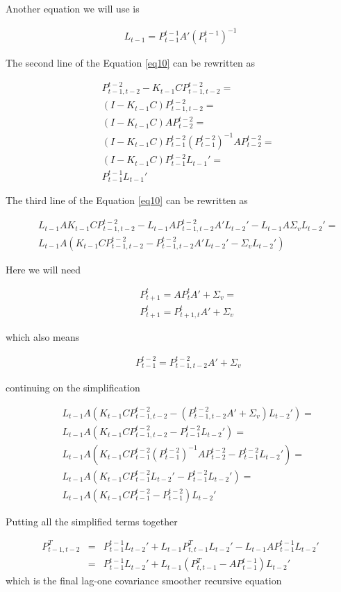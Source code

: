 \documentclass[12pt]{report}
\begin{document}
Another equation we will use is

\begin{eqnarray*}
L_{t-1} = P_{t-1}^{t-1}A'(P_t^{t-1})^{-1}
\end{eqnarray*}

The second line of the Equation \eqref{eq10} can be rewritten as

\begin{eqnarray*}
&& P_{t-1,t-2}^{t-2} - K_{t-1}CP_{t-1,t-2}^{t-2} = \\
&& (I - K_{t-1}C)P_{t-1,t-2}^{t-2} = \\
&& (I - K_{t-1}C) AP_{t-2}^{t-2} = \\
&& (I - K_{t-1}C)P_{t-1}^{t-2}(P_{t-1}^{t-2})^{-1}AP_{t-2}^{t-2} =\\
&& (I - K_{t-1}C)P_{t-1}^{t-2}L_{t-1}' = \\
&& P_{t-1}^{t-1}L_{t-1}'
\end{eqnarray*}

The third line of the Equation \eqref{eq10} can be rewritten as

\begin{eqnarray*}
&& L_{t-1}AK_{t-1}CP_{t-1,t-2}^{t-2} - L_{t-1}AP_{t-1,t-2}^{t-2}A'L_{t-2}' - L_{t-1}A\Sigma_vL_{t-2}'=\\
&& L_{t-1}A(K_{t-1}CP_{t-1,t-2}^{t-2} - P_{t-1,t-2}^{t-2}A'L_{t-2}' - \Sigma_vL_{t-2}')
\end{eqnarray*}

Here we will need 

\begin{eqnarray*}
&& P_{t+1}^t = AP_{t}^tA' + \Sigma_v =\\
&& P_{t+1}^t = P_{t+1,t}^tA' + \Sigma_v
\end{eqnarray*}

which also means

\begin{eqnarray*}
&& P_{t-1}^{t-2} = P_{t-1,t-2}^{t-2}A' + \Sigma_v
\end{eqnarray*}

continuing on the simplification

\begin{eqnarray*}
&& L_{t-1}A(K_{t-1}CP_{t-1,t-2}^{t-2} - (P_{t-1,t-2}^{t-2}A' + \Sigma_v)L_{t-2}')=\\
&& L_{t-1}A(K_{t-1}CP_{t-1,t-2}^{t-2} - P_{t-1}^{t-2}L_{t-2}')=\\
&& L_{t-1}A(K_{t-1}C P_{t-1}^{t-2}(P_{t-1}^{t-2})^{-1} A P_{t-2}^{t-2} - P_{t-1}^{t-2}L_{t-2}')=\\
&& L_{t-1}A(K_{t-1}C P_{t-1}^{t-2}L_{t-2}' - P_{t-1}^{t-2}L_{t-2}')=\\
&& L_{t-1}A(K_{t-1}C P_{t-1}^{t-2} - P_{t-1}^{t-2})L_{t-2}'
\end{eqnarray*}

Putting all the simplified terms together

\begin{eqnarray*}
P_{t-1,t-2}^T &=& P_{t-1}^{t-1}L_{t-2}' + L_{t-1}P_{t,t-1}^TL_{t-2}'
- L_{t-1}AP_{t-1}^{t-1}L_{t-2}'\\
 &=& P_{t-1}^{t-1}L_{t-2}' + L_{t-1}(P_{t,t-1}^T - AP_{t-1}^{t-1})L_{t-2}'
\end{eqnarray*}
which is the final lag-one covariance smoother recursive equation
\end{document}
